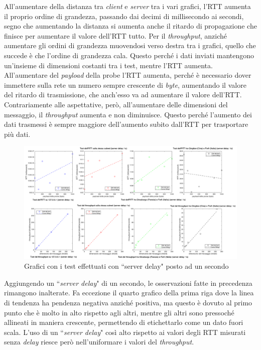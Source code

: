 \documentclass[a4paper, 12pt]{report}
\begin{document}
All'aumentare della distanza tra \textit{client} e \textit{server} tra i vari grafici, l'RTT aumenta il proprio ordine di grandezza, passando
dai decimi di millisecondo ai secondi, segno che aumentando la distanza si aumenta anche il ritardo di propagazione che finisce per aumentare il
valore dell'RTT tutto.\newline
Per il \textit{throughput}, anziché aumentare gli ordini di grandezza muovendosi verso destra tra i grafici, quello che succede è che l'ordine
di grandezza cala. Questo perché i dati inviati mantengono un'insieme di dimensioni costanti tra i test, mentre l'RTT aumenta.\newline
All'aumentare del \textit{payload} della probe l'RTT aumenta, perché è necessario dover immettere sulla rete un numero sempre 
crescente di \textit{byte}, aumentando il valore del ritardo di trasmissione, che anch'esso va ad aumentare il valore dell'RTT.\newline
Contrariamente alle aspettative, però, all'aumentare delle dimensioni del messaggio, il \textit{throughput} aumenta e non diminuisce. Questo perché
l'aumento dei dati trasmessi è sempre maggiore dell'aumento subito dall'RTT per trasportare più dati.

\begin{figure}[H]
	\centering
	\includegraphics[width=\linewidth]{images/delay.png}
	\caption{Grafici con i test effettuati con ``server delay" posto ad un secondo}
\end{figure}

Aggiungendo un ``\textit{server delay}" di un secondo, le osservazioni fatte in precedenza rimangono inalterate. Fa eccezione il quarto grafico della
prima riga dove la linea di tendenza ha pendenza negativa anziché positiva, ma questo è dovuto al primo punto che è molto in alto rispetto
agli altri, mentre gli altri sono pressoché allineati in maniera crescente, permettendo di etichettarlo come un dato fuori scala.\newline
L'uso di un ``\textit{server delay}" così alto rispetto ai valori degli RTT misurati senza \textit{delay} riesce però nell'uniformare i valori
del \textit{throughput}.
\end{document}
